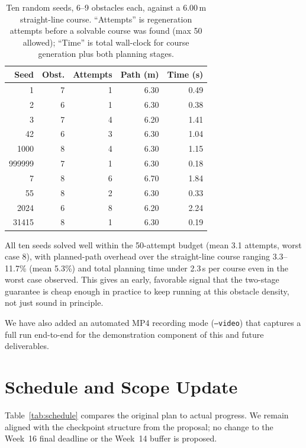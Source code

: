 \documentclass[10pt,twocolumn]{article}
\begin{document}
\begin{table}[h]
\centering
\small
\setlength{\tabcolsep}{4pt}
\begin{tabular}{@{}rrrrr@{}}
\toprule
\textbf{Seed} & \textbf{Obst.} & \textbf{Attempts} & \textbf{Path (m)} & \textbf{Time (s)} \\
\midrule
1       & 7 & 1 & 6.30 & 0.49 \\
2       & 6 & 1 & 6.30 & 0.38 \\
3       & 7 & 4 & 6.20 & 1.41 \\
42      & 6 & 3 & 6.30 & 1.04 \\
1000    & 8 & 4 & 6.30 & 1.15 \\
999999  & 7 & 1 & 6.30 & 0.18 \\
7       & 8 & 6 & 6.70 & 1.84 \\
55      & 8 & 2 & 6.30 & 0.33 \\
2024    & 6 & 8 & 6.20 & 2.24 \\
31415   & 8 & 1 & 6.30 & 0.19 \\
\bottomrule
\end{tabular}
\caption{Ten random seeds, 6--9 obstacles each, against a 6.00\,m
straight-line course. ``Attempts'' is regeneration attempts before a
solvable course was found (max 50 allowed); ``Time'' is total wall-clock
for course generation plus both planning stages.}
\label{tab:prelim}
\end{table}

All ten seeds solved well within the 50-attempt budget (mean 3.1 attempts,
worst case 8), with planned-path overhead over the straight-line course
ranging 3.3--11.7\% (mean 5.3\%) and total planning time under 2.3\,s per
course even in the worst case observed. This gives an early, favorable
signal that the two-stage guarantee is cheap enough in practice to keep
running at this obstacle density, not just sound in principle.

We have also added an automated MP4 recording mode (\texttt{--video}) that
captures a full run end-to-end for the demonstration component of this and
future deliverables.

\section{Schedule and Scope Update}
Table~\ref{tab:schedule} compares the original plan to actual progress.
We remain aligned with the checkpoint structure from the proposal; no
change to the Week~16 final deadline or the Week~14 buffer is proposed.
\end{document}
